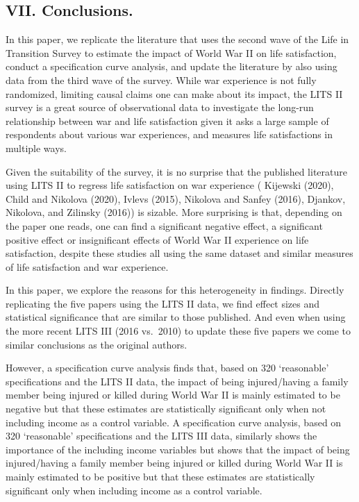 \documentclass[
  letterpaper,
  DIV=11,
  numbers=noendperiod]{scrartcl}
\begin{document}
\hypertarget{vii.-conclusions.}{%
\subsection{VII. Conclusions.}\label{vii.-conclusions.}}

In this paper, we replicate the literature that uses the second wave of
the Life in Transition Survey to estimate the impact of World War II on
life satisfaction, conduct a specification curve analysis, and update
the literature by also using data from the third wave of the survey.
While war experience is not fully randomized, limiting causal claims one
can make about its impact, the LITS II survey is a great source of
observational data to investigate the long-run relationship between war
and life satisfaction given it asks a large sample of respondents about
various war experiences, and measures life satisfactions in multiple
ways.

Given the suitability of the survey, it is no surprise that the
published literature using LITS II to regress life satisfaction on war
experience ( Kijewski (2020), Child and Nikolova (2020), Ivlevs (2015),
Nikolova and Sanfey (2016), Djankov, Nikolova, and Zilinsky (2016)) is
sizable. More surprising is that, depending on the paper one reads, one
can find a significant negative effect, a significant positive effect or
insignificant effects of World War II experience on life satisfaction,
despite these studies all using the same dataset and similar measures of
life satisfaction and war experience.

In this paper, we explore the reasons for this heterogeneity in
findings. Directly replicating the five papers using the LITS II data,
we find effect sizes and statistical significance that are similar to
those published. And even when using the more recent LITS III (2016
vs.~2010) to update these five papers we come to similar conclusions as
the original authors.

However, a specification curve analysis finds that, based on 320
`reasonable' specifications and the LITS II data, the impact of being
injured/having a family member being injured or killed during World War
II is mainly estimated to be negative but that these estimates are
statistically significant only when not including income as a control
variable. A specification curve analysis, based on 320 `reasonable'
specifications and the LITS III data, similarly shows the importance of
the including income variables but shows that the impact of being
injured/having a family member being injured or killed during World War
II is mainly estimated to be positive but that these estimates are
statistically significant only when including income as a control
variable.
\end{document}
